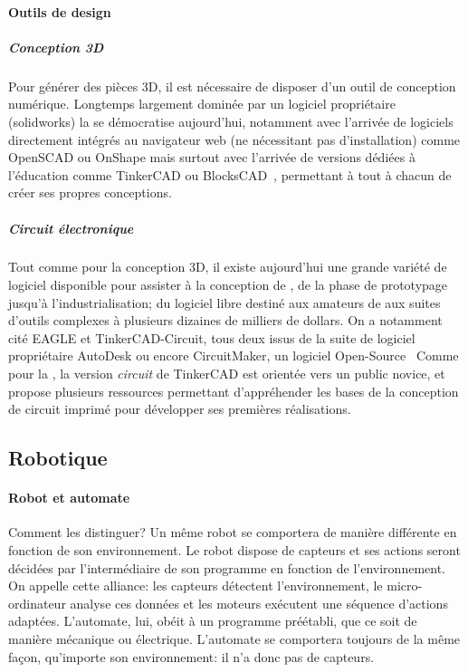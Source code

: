         \paragraph{Outils de design}
            \subparagraph{Conception 3D}
                Pour générer des pièces 3D, il est nécessaire de disposer d'un outil de conception numérique. Longtemps largement dominée par un logiciel propriétaire (solidworks) la  se démocratise aujourd'hui, notamment avec l'arrivée de logiciels directement intégrés au navigateur web (ne nécessitant pas d'installation) comme OpenSCAD ou OnShape mais surtout avec l'arrivée de versions dédiées à l'éducation comme TinkerCAD  ou BlocksCAD~, permettant à tout à chacun de créer ses propres conceptions.
            \subparagraph{Circuit électronique}
                Tout comme pour la conception 3D, il existe aujourd'hui une grande variété de logiciel disponible pour assister à la conception de , de la phase de prototypage jusqu’à l’industrialisation; du logiciel libre destiné aux amateurs de  aux suites d’outils complexes à plusieurs dizaines de milliers de dollars. On a notamment cité EAGLE et TinkerCAD-Circuit, tous deux issus de la suite de logiciel propriétaire AutoDesk ou encore CircuitMaker, un logiciel Open-Source~ Comme pour la , la version \textit{circuit} de TinkerCAD est orientée vers un public novice, et propose plusieurs ressources permettant d'appréhender les bases de la conception de circuit imprimé pour développer ses premières réalisations.    
    \subsection{Robotique}\label{sec:bot-concept}
        \paragraph{Robot et automate}
            Comment les distinguer?
            Un même robot se comportera de manière différente en fonction de son environnement. Le robot dispose de capteurs et ses actions seront décidées par l'intermédiaire de son programme en fonction de l'environnement.
            On appelle  cette alliance: les capteurs détectent l’environnement, le micro-ordinateur analyse ces données et les moteurs exécutent une séquence d’actions adaptées.
            L'automate, lui, obéit à un programme préétabli, que ce soit de manière mécanique ou électrique. L’automate se comportera toujours de la même façon, qu’importe son environnement: il n’a donc pas de capteurs.  
